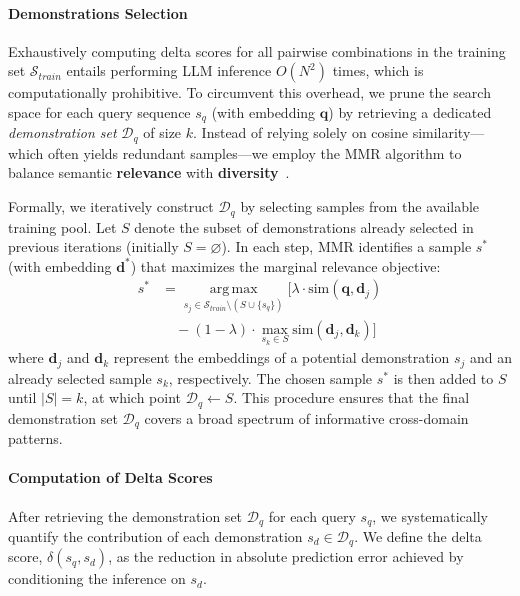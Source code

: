 \documentclass[lettersize,journal]{IEEEtran}
\begin{document}
\paragraph{Demonstrations Selection}
Exhaustively computing delta scores for all pairwise combinations in the training set $\mathcal{S}_{train}$ entails performing LLM inference $O(N^2)$ times, which is computationally prohibitive. To circumvent this overhead, we prune the search space for each query sequence $s_q$ (with embedding $\mathbf{q}$) by retrieving a dedicated \textit{demonstration set} $\mathcal{D}_q$ of size $k$. Instead of relying solely on cosine similarity—which often yields redundant samples—we employ the MMR algorithm to balance semantic \textbf{relevance} with \textbf{diversity}~\cite{carbonell1998use}.

Formally, we iteratively construct $\mathcal{D}_q$ by selecting samples from the available training pool. Let $S$ denote the subset of demonstrations already selected in previous iterations (initially $S = \varnothing$). In each step, MMR identifies a sample $s^*$ (with embedding $\mathbf{d}^*$) that maximizes the marginal relevance objective:
\begin{equation}
\begin{aligned}
s^* 
&= \operatorname*{arg\,max}_{s_j \in \mathcal{S}_{train} \setminus (S \cup \{s_q\})}
\Big[
\lambda \cdot \text{sim}(\mathbf{q}, \mathbf{d}_j) \\
&\quad - (1 - \lambda) \cdot 
\max_{s_k \in S} \text{sim}(\mathbf{d}_j, \mathbf{d}_k)
\Big]
\end{aligned}
\label{eq:mmr}
\end{equation}
where $\mathbf{d}_j$ and $\mathbf{d}_k$ represent the embeddings of a potential demonstration $s_j$ and an already selected sample $s_k$, respectively. The chosen sample $s^*$ is then added to $S$ until $|S|=k$, at which point $\mathcal{D}_q \leftarrow S$. This procedure ensures that the final demonstration set $\mathcal{D}_q$ covers a broad spectrum of informative cross-domain patterns.

\paragraph{Computation of Delta Scores}
After retrieving the demonstration set $\mathcal{D}_q$ for each query $s_q$, we systematically quantify the contribution of each demonstration $s_d \in \mathcal{D}_q$. We define the delta score, $\delta(s_q, s_d)$, as the reduction in absolute prediction error achieved by conditioning the inference on $s_d$.
\end{document}
